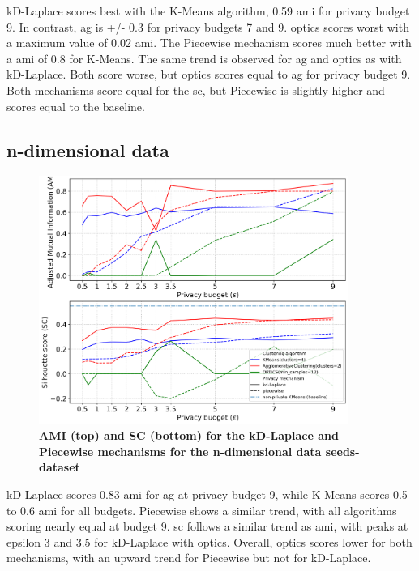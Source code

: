 kD-Laplace scores best with the K-Means algorithm, 0.59 \gls{ami} for privacy budget 9.
In contrast, \gls{ag} is +/- 0.3 for privacy budgets 7 and 9. \gls{optics} scores worst with a maximum value of 0.02 \gls{ami}.
The Piecewise mechanism scores much better with a \gls{ami} of 0.8 for K-Means. The same trend is observed for \gls{ag} and \gls{optics} as with kD-Laplace.
Both score worse, but \gls{optics} scores equal to \gls{ag} for privacy budget 9.
Both mechanisms score equal for the \gls{sc}, but Piecewise is slightly higher and scores equal to the baseline.
\newpage
\subsection{n-dimensional data}
\begin{figure}[H]
  \centering

  \caption{\textbf{AMI (top) and SC (bottom) for the kD-Laplace and Piecewise mechanisms for the n-dimensional data seeds-dataset}}
  \includegraphics[width=0.9\textwidth]{Results/kd-laplace/kd-Laplace/seeds-dataset/ami-and-sc_7_dimensions.png}

  \label{fig:validation-seeds-dataset_comparison_nd-laplace}
\end{figure}
kD-Laplace scores 0.83 \gls{ami} for \gls{ag} at privacy budget 9, while K-Means scores 0.5 to 0.6 \gls{ami} for all budgets.
Piecewise shows a similar trend, with all algorithms scoring nearly equal at budget 9. \gls{sc} follows a similar trend as \gls{ami}, with peaks at epsilon 3 and 3.5 for kD-Laplace with \gls{optics}. Overall, \gls{optics} scores lower for both mechanisms, with an upward trend for Piecewise but not for kD-Laplace.

